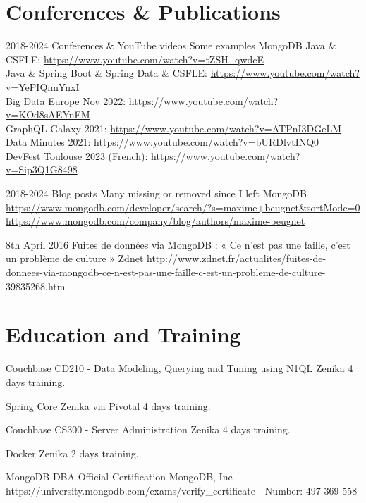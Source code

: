 \documentclass[11pt,a4paper,sans]{moderncv}
\begin{document}
\section{Conferences \& Publications}\label{sec:publications}

\cventry
{2018-2024}
{Conferences \& YouTube videos}
{Some examples}
{}
{MongoDB}
{
    Java \& CSFLE: \url{https://www.youtube.com/watch?v=tZSH--qwdcE}\\
    Java \& Spring Boot \& Spring Data \& CSFLE: \url{https://www.youtube.com/watch?v=YePIQimYnxI}\\
    Big Data Europe Nov 2022: \url{https://www.youtube.com/watch?v=KOd8sAEYnFM}\\
    GraphQL Galaxy 2021: \url{https://www.youtube.com/watch?v=ATPnI3DGeLM}\\
    Data Minutes 2021: \url{https://www.youtube.com/watch?v=bURDlvtINQ0}\\
    DevFest Toulouse 2023 (French): \url{https://www.youtube.com/watch?v=Sip3Q1G8498}
}

\cventry
{2018-2024}
{Blog posts}
{Many missing or removed since I left}
{}
{MongoDB}
{\url{https://www.mongodb.com/developer/search/?s=maxime+beugnet\&sortMode=0}\\\url{https://www.mongodb.com/company/blog/authors/maxime-beugnet}}

\cventry
{8th April 2016}
{Fuites de données via MongoDB : « Ce n’est pas une faille, c’est un problème de culture »}
{}
{Zdnet}
{}
{http://www.zdnet.fr/actualites/fuites-de-donnees-via-mongodb-ce-n-est-pas-une-faille-c-est-un-probleme-de-culture-39835268.htm}   %

\section{Education and Training}\label{sec:education-and-training}

{Couchbase CD210 - Data Modeling, Querying and Tuning using N1QL}
{Zenika}
{}
{}
{4 days training.}

{Spring Core}
{Zenika via Pivotal}
{}
{}
{4 days training.}

{Couchbase CS300 - Server Administration}
{Zenika}
{}
{}
{4 days training.}

{Docker}
{Zenika}
{}
{}
{2 days training.}

{MongoDB DBA Official Certification}
{MongoDB, Inc}
{}
{}
{https://university.mongodb.com/exams/verify\_certificate - Number: 497-369-558}
\end{document}
